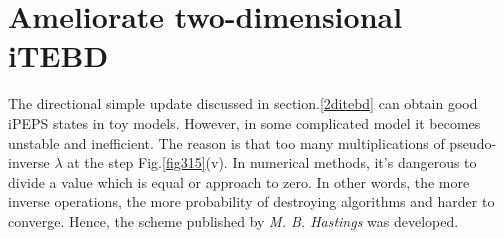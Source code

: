 \section{Ameliorate two-dimensional iTEBD}
\label{2dhastin}

The directional simple update discussed in section.\ref{2ditebd} can obtain good iPEPS states in toy models. However, in some complicated model it becomes unstable and inefficient. The reason is that too many multiplications of pseudo-inverse $\lambda$ at the step Fig.\ref{fig315}(v). In numerical methods, it's dangerous to divide a value which is equal or approach to zero. In other words, the more inverse operations, the more probability of destroying algorithms and harder to converge. Hence, the scheme published by \textit{M. B. Hastings} \cite{hastings_light-cone_2009} was developed.

